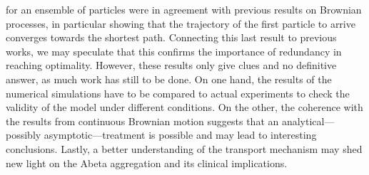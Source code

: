 for an ensemble of particles were in agreement with previous results on Brownian processes, in particular showing that the trajectory of the first particle to arrive converges towards the shortest path. Connecting this last result to previous works, we may speculate that this confirms the importance of redundancy in reaching optimality.
However, these results only give clues and no definitive answer, as much work has still to be done. On one hand, the results of the numerical simulations have to be compared to actual experiments to check the validity of the model under different conditions. On the other, the coherence with the results from continuous Brownian motion suggests that an analytical—possibly asymptotic—treatment is possible and may lead to interesting conclusions. Lastly, a better understanding of the  transport mechanism may shed new light on the Abeta aggregation and its clinical implications.
